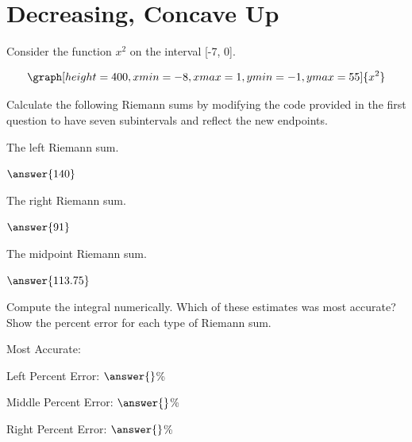 \documentclass{ximera}
\begin{document}
\section{Decreasing, Concave Up}
\begin{question}
Consider the function $x^2$ on the interval [-7, 0].

\[
\graph[height=400,xmin=-8,xmax=1,ymin=-1,ymax=55]{x^2}
\]

Calculate the following Riemann sums by modifying the code provided in the first question to have seven subintervals and reflect the new endpoints.

The left Riemann sum.

\begin{onlineOnly}
\begin{sageCell}

\end{sageCell}
\end{onlineOnly}

$\answer{140}$

The right Riemann sum.

\begin{onlineOnly}
\begin{sageCell}

\end{sageCell}
\end{onlineOnly}

$\answer{91}$

The midpoint Riemann sum.

\begin{onlineOnly}
\begin{sageCell}

\end{sageCell}
\end{onlineOnly}

$\answer{113.75}$

Compute the integral numerically. Which of these estimates was most accurate? Show the percent error for each type of Riemann sum.

\begin{onlineOnly}
\begin{sageCell}

\end{sageCell}
\end{onlineOnly}

Most Accurate:
\begin{multipleChoice}
\end{multipleChoice}
Left Percent Error: $\answer{}$\%

Middle Percent Error: $\answer{}$\%

Right Percent Error: $\answer{}$\%
\end{question}
\end{document}
